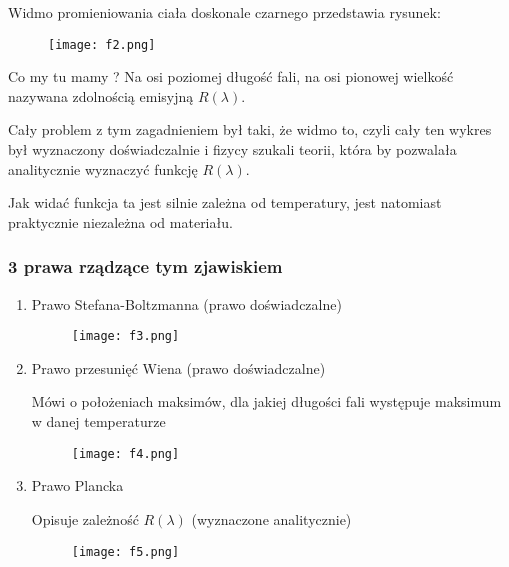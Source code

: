 \documentclass[a4paper,15pt]{article}
\begin{document}
Widmo promieniowania ciała doskonale czarnego przedstawia rysunek:

\begin{figure}[H]
\centerline{\texttt{[image: f2.png]}}
\end{figure}

Co my tu mamy ? Na osi poziomej długość fali, na osi pionowej wielkość nazywana zdolnością emisyjną $R(\lambda)$. 

Cały problem z tym zagadnieniem był taki, że widmo to, czyli cały ten wykres był wyznaczony doświadczalnie i fizycy szukali teorii, która by pozwalała analitycznie wyznaczyć funkcję  $R(\lambda)$. 

Jak widać funkcja ta jest silnie zależna od temperatury, jest natomiast praktycznie niezależna od materiału. 

\newpage
\subsubsection{3 prawa rządzące tym zjawiskiem}

\begin{enumerate}
\item Prawo Stefana-Boltzmanna (prawo doświadczalne)
\begin{figure}[H]
\centerline{\texttt{[image: f3.png]}}
\end{figure}
\item Prawo przesunięć Wiena (prawo doświadczalne)

Mówi o położeniach maksimów, dla jakiej długości fali występuje maksimum w danej temperaturze
\begin{figure}[H]
\centerline{\texttt{[image: f4.png]}}
\end{figure}

\item Prawo Plancka 

Opisuje zależność $R(\lambda)$ (wyznaczone analitycznie)
\begin{figure}[H]
\centerline{\texttt{[image: f5.png]}}
\end{figure}

\end{enumerate}

\newpage
\end{document}
